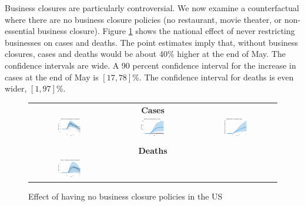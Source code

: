 \documentclass[11pt,reqno,letter]{amsart}
\theoremstyle{definition}
\begin{document}
Business closures are particularly controversial. We now examine a
counterfactual where there are no business closure policies (no
restaurant, movie theater, or non-essential business closure).  Figure
\ref{fig:US-business} shows the national effect of never restricting
businesses on cases and deaths. The point estimates imply that,
without business closures, cases and deaths would be about 40\% higher
at the end of May. The confidence intervals are wide. A 90 percent
confidence interval for the increase in cases at the end of May is
$[17,78]$\%.
The confidence interval for deaths is even wider, $[1, 97]$\%.


\begin{figure}[ht]
  \caption{Effect of having no business closure policies in the US\label{fig:US-business}}
  \begin{minipage}{\linewidth}
    \centering
    \begin{tabular}{ccc}
      \multicolumn{3}{c}{\textbf{Cases}} \\
      \includegraphics[width=0.31\textwidth]{tables_and_figures/us-index-dgrowth_idx}
      &
      \includegraphics[width=0.31\textwidth]{tables_and_figures/us-index-dcases_idx}
      &
        \includegraphics[width=0.31\textwidth]{tables_and_figures/us-index-rcumu_idx}
      \\
      \\
      \multicolumn{3}{c}{\textbf{Deaths}} \\
      \includegraphics[width=0.31\textwidth]{tables_and_figures/us-index-dgrowth_deaths_idx}

\end{tabular}
\end{minipage}
\end{figure}
\end{document}
